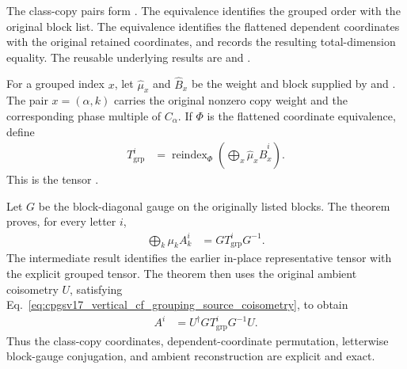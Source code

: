 \documentclass{article}
\begin{document}
The class-copy pairs form
. The equivalence
 identifies the grouped
order with the original block list. The equivalence
 identifies the
flattened dependent coordinates with the original retained coordinates, and
 records the resulting
total-dimension equality. The reusable underlying results are
 and
.

For a grouped index $x$, let $\widehat\mu_x$ and $\widehat B_x$ be the weight
and block supplied by
 and
. The pair
$x=(\alpha,k)$ carries the original nonzero copy weight and the corresponding
phase multiple of $C_\alpha$. If $\Phi$ is the flattened coordinate
equivalence, define
\begin{align}
    T_{\mathrm{grp}}^i
     & =
    \operatorname{reindex}_{\Phi}
    \left(\bigoplus_x
    \widehat\mu_x\widehat B_x^i\right).
    \label{eq:cpgsv17_vertical_cf_grouping_completed_grouped_tensor}
\end{align}
This is the tensor
.

Let $G$ be the block-diagonal gauge on the originally listed blocks. The theorem
proves, for every letter $i$,
\begin{align}
    \bigoplus_k\mu_kA_k^i
     & =GT_{\mathrm{grp}}^iG^{-1}.
    \label{eq:cpgsv17_vertical_cf_grouping_completed_regrouping}
\end{align}
The intermediate result
identifies the earlier in-place representative tensor with the explicit
grouped tensor. The theorem
 then
uses the original ambient coisometry $U$, satisfying
Eq.~\ref{eq:cpgsv17_vertical_cf_grouping_source_coisometry}, to obtain
\begin{align}
    A^i
     & =U^\dagger GT_{\mathrm{grp}}^iG^{-1}U.
    \label{eq:cpgsv17_vertical_cf_grouping_completed_reconstruction}
\end{align}
Thus the class-copy coordinates, dependent-coordinate permutation, letterwise
block-gauge conjugation, and ambient reconstruction are explicit and exact.
\end{document}
